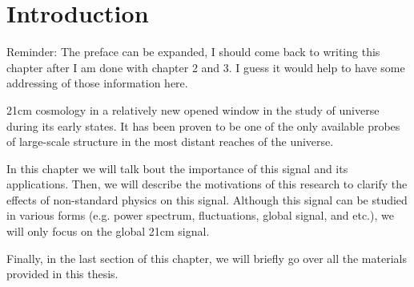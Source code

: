 \documentclass[12pt, TexShade, letterpaper]{report}
\begin{document}
	\listoffigures\thispagestyle{plain}
	\listoftables
	\glsaddall
	\setlength\LTleft{0pt}
	\setlength\LTright{0pt}
	\setlength\glsdescwidth{0.8\hsize}
	\printglossary[title={List of Acronyms}]

 	\clearpage
	
	\glsresetall
\chapter{Introduction}
\label{chap:intro}
Reminder: The preface can be expanded, I should come back to writing this chapter after I am done with chapter 2 and 3. I guess it would help to have some addressing of those information here. \par
21cm cosmology in a relatively new opened window in the study of universe during its early states. It has been proven to be one of the only available probes of large-scale structure in the most distant reaches of the universe\cite{primordial_universe}.\par
In this chapter we will talk bout the importance of this signal and its applications. Then, we will describe the motivations of this research to clarify the effects of non-standard physics on this signal. Although this signal can be studied in various forms (e.g. power spectrum, fluctuations, global signal, and etc.), we will only focus on the global 21cm signal.\par
Finally, in the last section of this chapter, we will briefly go over all the materials provided in this thesis.\par
\end{document}
